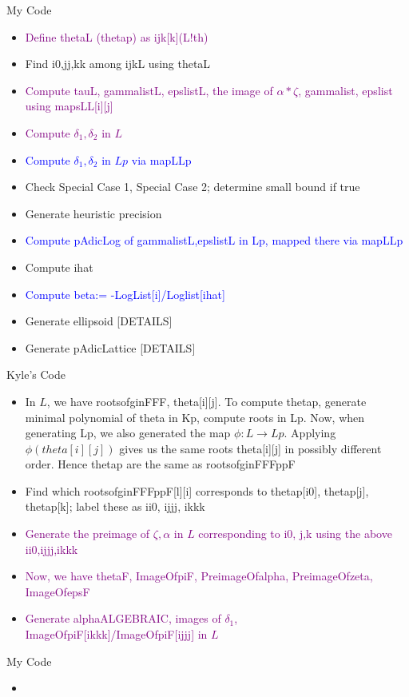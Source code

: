\documentclass[11pt]{article}
\theoremstyle{definition}
\begin{document}
\begin{multicols}{2}
My Code
\begin{itemize}
\item \textcolor{purple}{Define thetaL (thetap) as ijk[k](L!th)}
\item Find i0,jj,kk among ijkL using thetaL
\item \textcolor{purple}{Compute tauL, gammalistL, epslistL, the image of $\alpha*\zeta$, gammalist, epslist using mapsLL[i][j]}
\item \textcolor{purple}{Compute $\delta_1, \delta_2$ in $L$}
\item \textcolor{blue}{Compute $\delta_1, \delta_2$ in $Lp$ via mapLLp}
\item Check Special Case 1, Special Case 2; determine small bound if true
\item Generate heuristic precision
\item \textcolor{blue}{Compute pAdicLog of gammalistL,epslistL in Lp, mapped there via mapLLp}
\item Compute ihat
\item \textcolor{blue}{Compute beta:= -LogList[i]/Loglist[ihat]}
\item Generate ellipsoid [DETAILS]
\item Generate pAdicLattice [DETAILS]
\end{itemize}
\end{multicols}

\begin{multicols}{2}
Kyle's Code
\begin{itemize}
\item In $L$, we have rootsofginFFF, theta[i][j]. To compute thetap, generate minimal polynomial of theta in Kp, compute roots in Lp. Now, when generating Lp, we also generated the map $\phi:L \to Lp$. Applying $\phi(theta[i][j])$ gives us the same roots theta[i][j] in possibly different order. Hence thetap are the same as rootsofginFFFppF
\item Find which rootsofginFFFppF[l][i] corresponds to thetap[i0], thetap[j], thetap[k]; label these as ii0, ijjj, ikkk
\item \textcolor{purple}{Generate the preimage of $\zeta, \alpha$ in $L$ corresponding to i0, j,k using the above ii0,ijjj,ikkk}
\item \textcolor{purple}{Now, we have thetaF, ImageOfpiF, PreimageOfalpha, PreimageOfzeta, ImageOfepsF}
\item \textcolor{purple}{Generate alphaALGEBRAIC, images of $\delta_1$, ImageOfpiF[ikkk]/ImageOfpiF[ijjj] in $L$}
\end{itemize}

\columnbreak 

My Code
\begin{itemize}
\item
\end{itemize}
\end{multicols}
\end{document}
